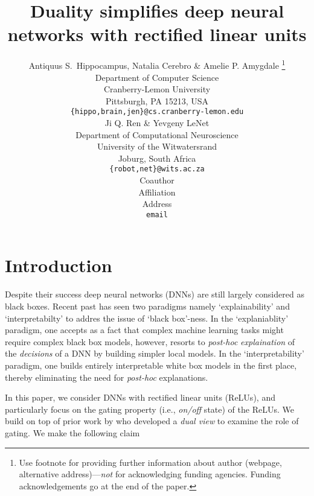 \documentclass{article} %
\title{Duality simplifies deep neural networks with rectified linear units}
\author{Antiquus S.~Hippocampus, Natalia Cerebro \& Amelie P. Amygdale \thanks{ Use footnote for providing further information
about author (webpage, alternative address)---\emph{not} for acknowledging
funding agencies.  Funding acknowledgements go at the end of the paper.} \\
Department of Computer Science\\
Cranberry-Lemon University\\
Pittsburgh, PA 15213, USA \\
\texttt{\{hippo,brain,jen\}@cs.cranberry-lemon.edu} \\
\And
Ji Q. Ren \& Yevgeny LeNet \\
Department of Computational Neuroscience \\
University of the Witwatersrand \\
Joburg, South Africa \\
\texttt{\{robot,net\}@wits.ac.za} \\
\AND
Coauthor \\
Affiliation \\
Address \\
\texttt{email}
}
\begin{document}
\maketitle





\section{Introduction}

Despite their success deep neural networks (DNNs) are still largely considered as black boxes. Recent past has seen two paradigms namely `explainability' and `interpretabilty' to addres the issue of `black box'-ness. In the  `explaniablity' paradigm, one accepts as a fact that complex machine learning tasks might require complex black box models, however, resorts to \emph{post-hoc} \emph{explaination} of the \emph{decisions} of a DNN by building simpler local models. In the `interpretability' paradigm, one builds entirely interpretable white box models in the first place, thereby eliminating the need for \emph{post-hoc} explanations. 

In this paper, we consider DNNs with rectified linear units (ReLUs), and particularly focus on the gating property (i.e., \emph{on/off} state) of the ReLUs. We build on top of prior work by \cite{npk} who developed a \emph{dual view} to examine the role of gating.  We make the following claim
\end{document}
